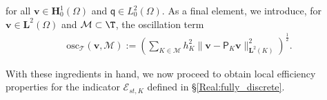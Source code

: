 \documentclass[final]{siamart0216}
\begin{document}
for all $\mathbf{v}\in \mathbf{H}_0^1(\Omega)$ and $\mathsf{q}\in L_0^2(\Omega)$.
As a final element, we introduce, for $\mathbf{v}\in \mathbf{L}^2(\Omega)$ and $\mathcal{M}\subset\T$, the oscillation term
\begin{align*}
\text{osc}_{\mathscr{T}}(\mathbf{v},\mathcal{M}):= \left( \sum_{K\in\mathcal{M}}h_{K}^2 \|\mathbf{v}-\mathsf{P}_K \mathbf{v}\|_{\mathbf{L}^2(K)}^2 \right)^{\frac{1}{2}}.
\end{align*}

With these ingredients in hand, we now proceed to obtain local efficiency properties for the indicator $\mathcal{E}_{st,K}$ defined in \S\ref{Real:fully_discrete}.
\end{document}
